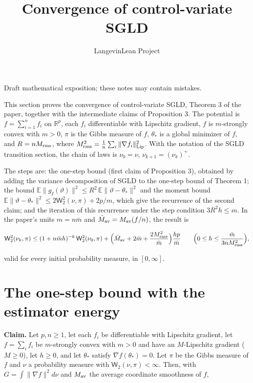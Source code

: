 \documentclass[11pt,a4paper]{article}
\title{\texorpdfstring{Convergence of control-variate SGLD}{Convergence of control-variate SGLD}}
\author{LangevinLean Project}
\date{}
\begin{document}
\maketitle
Draft mathematical exposition; these notes may contain mistakes.


This section proves the convergence of control-variate SGLD, Theorem 3 of the paper, together with the intermediate claims of Proposition 3. The potential is \(f=\sum_{i=1}^nf_i\) on \(\mathbb R^p\), each \(f_i\) differentiable with Lipschitz gradient, \(f\) is \(m\)-strongly convex with \(m>0\), \(\pi\) is the Gibbs measure of \(f\), \(\theta_*\) is a global minimizer of \(f\), and \(R=nM_{\rm rms}\), where \(M_{\rm rms}^2=\frac1n\sum_i\|\nabla f_i\|_{\rm Lip}^2\). With the notation of the SGLD transition section, the chain of laws is \(\nu_0=\nu\), \(\nu_{k+1}=(\nu_k)^+\).




The steps are: the one-step bound (first claim of Proposition 3), obtained by adding the variance decomposition of SGLD to the one-step bound of Theorem 1; the bound \(\mathbb E\|g_I(\vartheta)\|^2\le R^2\,\mathbb E\|\vartheta-\theta_*\|^2\) and the moment bound \(\mathbb E\|\vartheta-\theta_*\|^2\le2\mathsf W_2^2(\nu,\pi)+2p/m\), which give the recurrence of the second claim; and the iteration of this recurrence under the step condition \(3R^2h\le m\). In the paper's units \(m=n\bar m\) and \(\bar M_{\rm av}=M_{\rm av}(f/n)\), the result is


\[\mathsf W_2^2(\nu_k,\pi)\le(1+n\bar mh)^{-k}\,\mathsf W_2^2(\nu_0,\pi)+\Bigl(\bar M_{\rm av}+2\bar m+\frac{2M_{\rm rms}^2}{\bar m}\Bigr)\frac{hp}{\bar m}\qquad\Bigl(0\le h\le\frac{\bar m}{3nM_{\rm rms}^2}\Bigr),\]


valid for every initial probability measure, in \([0,\infty]\).


\section{\texorpdfstring{The one-step bound with the estimator energy}{The one-step bound with the estimator energy}}


\textbf{Claim.} Let \(p,n\ge1\), let each \(f_i\) be differentiable with Lipschitz gradient, let \(f=\sum_if_i\) be \(m\)-strongly convex with \(m>0\) and have an \(M\)-Lipschitz gradient (\(M\ge0\)), let \(h\ge0\), and let \(\theta_*\) satisfy \(\nabla f(\theta_*)=0\). Let \(\pi\) be the Gibbs measure of \(f\) and \(\nu\) a probability measure with \(\mathsf W_2(\nu,\pi)<\infty\). Then, with \(G=\int\|\nabla f\|^2d\nu\) and \(M_{\rm av}\) the average coordinate smoothness of \(f\),
\end{document}
